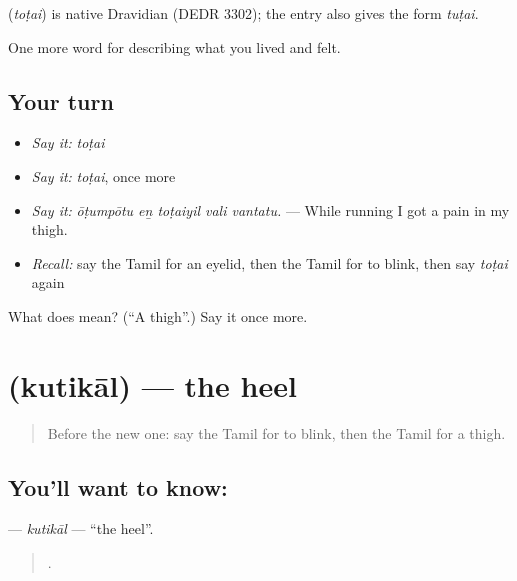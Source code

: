 \begin{cousinweb}
\textbf{} (\emph{toṭai}) is native Dravidian (DEDR 3302); the entry also gives the form  \emph{tuṭai}.
\end{cousinweb}

\begin{grammarlens}[title={What you've built}]
One more word for describing what you lived and felt.
\end{grammarlens}

\subsection*{Your turn}
\begin{itemize}
\raggedright
  \item \emph{Say it:} \emph{toṭai}
  \item \emph{Say it:} \emph{toṭai}, once more
  \item \emph{Say it:} \emph{ōṭumpōtu eṉ toṭaiyil vali vantatu.} — While running I got a pain in my thigh.
  \item \emph{Recall:} say the Tamil for an eyelid, then the Tamil for to blink, then say \emph{toṭai} again
\end{itemize}

\begin{tcolorbox}[breakable,colback=teal!4,colframe=teal!35!black,title={Before you move on}]
What does  mean? (\textquotedblleft{}A thigh\textquotedblright{}.) Say it once more.
\end{tcolorbox}
\section[\texorpdfstring{\ta{குதிகால்} (kutikāl)}{குதிகால் (kutikāl)}]{ (kutikāl) — the heel}

\label{lesson:TA-C481-kutikal}



\begin{quote}
Before the new one: say the Tamil for to blink, then the Tamil for a thigh.
\end{quote}

\subsection*{You'll want to know: }
\textbf{} — \emph{kutikāl} — \textquotedblleft{}the heel\textquotedblright{}.

\begin{quote}
    .
\end{quote}

